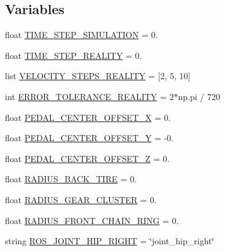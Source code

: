 \subsection*{Variables}
\begin{DoxyCompactItemize}
\item 
float \mbox{\hyperlink{namespacevelocity__test_a44f8e7148085952bdc0b8a159c5a3269}{T\+I\+M\+E\+\_\+\+S\+T\+E\+P\+\_\+\+S\+I\+M\+U\+L\+A\+T\+I\+ON}} = 0.
\item 
float \mbox{\hyperlink{namespacevelocity__test_acd9fa0ea415955fa2a0ad6baa33e75ad}{T\+I\+M\+E\+\_\+\+S\+T\+E\+P\+\_\+\+R\+E\+A\+L\+I\+TY}} = 0.
\item 
list \mbox{\hyperlink{namespacevelocity__test_a4723db82d376b8404d42425d872a453e}{V\+E\+L\+O\+C\+I\+T\+Y\+\_\+\+S\+T\+E\+P\+S\+\_\+\+R\+E\+A\+L\+I\+TY}} = \mbox{[}2, 5, 10\mbox{]}
\item 
int \mbox{\hyperlink{namespacevelocity__test_aff3865a893342d83613d51d6a735bffd}{E\+R\+R\+O\+R\+\_\+\+T\+O\+L\+E\+R\+A\+N\+C\+E\+\_\+\+R\+E\+A\+L\+I\+TY}} = 2$\ast$np.\+pi / 720
\item 
float \mbox{\hyperlink{namespacevelocity__test_ac597badfac305e8b24a84979e5931501}{P\+E\+D\+A\+L\+\_\+\+C\+E\+N\+T\+E\+R\+\_\+\+O\+F\+F\+S\+E\+T\+\_\+X}} = 0.
\item 
float \mbox{\hyperlink{namespacevelocity__test_af63430f1018d64f889e1cf85acbf560f}{P\+E\+D\+A\+L\+\_\+\+C\+E\+N\+T\+E\+R\+\_\+\+O\+F\+F\+S\+E\+T\+\_\+Y}} = -\/0.
\item 
float \mbox{\hyperlink{namespacevelocity__test_a010eece7b21741b6206e8838fa113087}{P\+E\+D\+A\+L\+\_\+\+C\+E\+N\+T\+E\+R\+\_\+\+O\+F\+F\+S\+E\+T\+\_\+Z}} = 0.
\item 
float \mbox{\hyperlink{namespacevelocity__test_acb4d3926b9f53fdc746eb32aba337cae}{R\+A\+D\+I\+U\+S\+\_\+\+B\+A\+C\+K\+\_\+\+T\+I\+RE}} = 0.
\item 
float \mbox{\hyperlink{namespacevelocity__test_a15f4e59795cace3f0a02eba578d141dd}{R\+A\+D\+I\+U\+S\+\_\+\+G\+E\+A\+R\+\_\+\+C\+L\+U\+S\+T\+ER}} = 0.
\item 
float \mbox{\hyperlink{namespacevelocity__test_a36468a70fd64a0876bee48ed094ae1aa}{R\+A\+D\+I\+U\+S\+\_\+\+F\+R\+O\+N\+T\+\_\+\+C\+H\+A\+I\+N\+\_\+\+R\+I\+NG}} = 0.
\item 
string \mbox{\hyperlink{namespacevelocity__test_ada688e57f19532636c56960634fa8c40}{R\+O\+S\+\_\+\+J\+O\+I\+N\+T\+\_\+\+H\+I\+P\+\_\+\+R\+I\+G\+HT}} = \char`\"{}joint\+\_\+hip\+\_\+right\char`\"{}
\item 

\end{DoxyCompactItemize}
